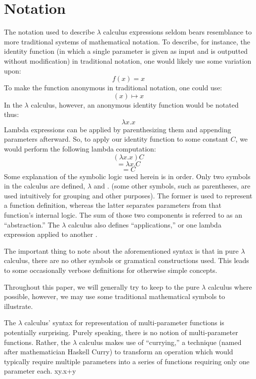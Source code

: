 \documentclass{article}
\begin{document}
\section{Notation}
The notation used to describe $\lambda$ calculus expressions seldom bears resemblance to more traditional systems of mathematical notation. To describe, for instance, the identity function (in which a single parameter is given as input and is outputted without modification) in traditional notation, one would likely use some variation upon:
$$f(x)=x$$
To make the function anonymous in traditional notation, one could use:
$$(x) \mapsto x$$
In the $\lambda$ calculus, however, an anonymous identity function would be notated thus:
$$\lambda x.x$$
Lambda expressions can be applied by parenthesizing them and appending parameters afterward. So, to apply our identity function to some constant $C$, we would perform the following lambda computation:
$$(\lambda x.x)C$$
$$=\lambda x.C$$
$$=C$$
Some explanation of the symbolic logic used herein is in order. Only two symbols in the calculus are defined, $\lambda$ and $.$ (some other symbols, such as parentheses, are used intuitively for grouping and other purposes). The former is used to represent a function definition, whereas the latter separates parameters from that function's internal logic. The sum of those two components is referred to as an ``abstraction.'' The $\lambda$ calculus also defines ``applications,'' or one lambda expression applied to another \cite{horowitz}.

The important thing to note about the aforementioned syntax is that in pure $\lambda$ calculus, there are no other symbols or gramatical constructions used. This leads to some occasionally verbose definitions for otherwise simple concepts.

Throughout this paper, we will generally try to keep to the pure $\lambda$ calculus where possible, however, we may use some traditional mathematical symbols to illustrate.

The $\lambda$ calculus' syntax for representation of multi-parameter functions is potentially surprising. Purely speaking, there is no notion of multi-parameter functions. Rather, the $\lambda$ calculus makes use of ``currying,'' a technique (named after mathematician Haskell Curry) to transform an operation which would typically require multiple parameters into a series of functions requiring only one parameter each.
$$\lambda xy.x+y


\end{document}
